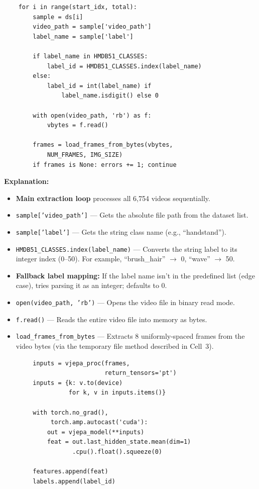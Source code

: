 \documentclass[a4paper, 12pt]{article}
\newenvironment{explanation}{%
  \par\smallskip
  \noindent\textcolor{blue!70!black}{\textbf{Explanation:}}\\
  \noindent
}{\par\medskip}
\begin{document}
\begin{lstlisting}
    for i in range(start_idx, total):
        sample = ds[i]
        video_path = sample['video_path']
        label_name = sample['label']

        if label_name in HMDB51_CLASSES:
            label_id = HMDB51_CLASSES.index(label_name)
        else:
            label_id = int(label_name) if
                label_name.isdigit() else 0

        with open(video_path, 'rb') as f:
            vbytes = f.read()

        frames = load_frames_from_bytes(vbytes,
            NUM_FRAMES, IMG_SIZE)
        if frames is None: errors += 1; continue
\end{lstlisting}

\begin{explanation}
\begin{itemize}[nosep]
  \item \textbf{Main extraction loop} processes all 6,754 videos sequentially.
  \item \texttt{sample['video\_path']} --- Gets the absolute file path from the dataset list.
  \item \texttt{sample['label']} --- Gets the string class name (e.g., ``handstand'').
  \item \texttt{HMDB51\_CLASSES.index(label\_name)} --- Converts the string label to its integer index (0--50). For example, ``brush\_hair'' $\to$ 0, ``wave'' $\to$ 50.
  \item \textbf{Fallback label mapping:} If the label name isn't in the predefined list (edge case), tries parsing it as an integer; defaults to 0.
  \item \texttt{open(video\_path, 'rb')} --- Opens the video file in binary read mode.
  \item \texttt{f.read()} --- Reads the entire video file into memory as bytes.
  \item \texttt{load\_frames\_from\_bytes} --- Extracts 8 uniformly-spaced frames from the video bytes (via the temporary file method described in Cell~3).
\end{itemize}
\end{explanation}

\begin{lstlisting}
        inputs = vjepa_proc(frames,
                            return_tensors='pt')
        inputs = {k: v.to(device)
                  for k, v in inputs.items()}

        with torch.no_grad(),
             torch.amp.autocast('cuda'):
            out = vjepa_model(**inputs)
            feat = out.last_hidden_state.mean(dim=1)
                   .cpu().float().squeeze(0)

        features.append(feat)
        labels.append(label_id)
\end{lstlisting}
\end{document}
